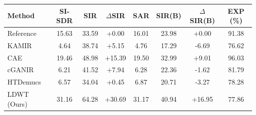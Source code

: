 \begin{tabular}{lccccccc}
\toprule
Method & SI-SDR & SIR & $\Delta$SIR & SAR & SIR(B) & $\Delta$SIR(B) & EXP (\%) \\
\midrule
Reference & 15.63 & 33.59 & +0.00 & 16.01 & 23.98 & +0.00 & 91.38 \\
KAMIR & 4.64 & 38.74 & +5.15 & 4.76 & 17.29 & -6.69 & 76.62 \\
CAE & 19.46 & 48.98 & +15.39 & 19.50 & 32.99 & +9.01 & 96.03 \\
cGANIR & 6.21 & 41.52 & +7.94 & 6.28 & 22.36 & -1.62 & 81.79 \\
HTDemucs & 6.57 & 34.04 & +0.45 & 6.87 & 20.71 & -3.27 & 78.28 \\
LDWT (Ours) & 31.16 & 64.28 & +30.69 & 31.17 & 40.94 & +16.95 & 77.86 \\
\bottomrule
\end{tabular}

